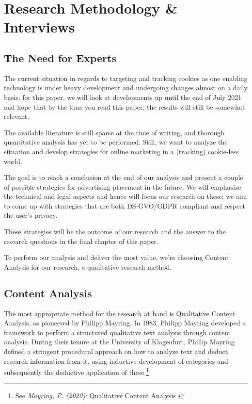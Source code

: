 %
%

\pagebreak
\section{Research Methodology \& Interviews}

\onehalfspacing

\subsection{The Need for Experts}

The current situation in regards to targeting and tracking cookies as one enabling technology is under heavy development and undergoing changes almost on a daily basis; for this paper, we will look at developments up until the end of July 2021 and hope that by the time you read this paper, the results will still be somewhat relevant.

The available literature is still sparse at the time of writing, and thorough quantitative analysis has yet to be performed. Still, we want to analyze the situation and develop strategies for online marketing in a (tracking) cookie-less world.

The goal is to reach a conclusion at the end of our analysis and present a couple of possible strategies for advertising placement in the future. We will emphasize the technical and legal aspects and hence will focus our research on these; we aim to come up with strategies that are both DS-GVO/GDPR compliant and respect the user's privacy.

These strategies will be the outcome of our research and the answer to the research questions in the final chapter of this paper.

To perform our analysis and deliver the most value, we're choosing Content Analysis for our research, a qualitative research method.

\subsection{Content Analysis}

The most appropriate method for the research at hand is Qualitative Content Analysis, as pioneered by Philipp Mayring. In 1983, Philipp Mayring developed a framework to perform a structured qualitative text analysis through content analysis. During their tenure at the University of Klagenfurt, Phillip Mayring defined a stringent procedural approach on how to analyze text and deduct research information from it, using inductive development of categories and subsequently the deductive application of these.\footnote{See \textit{Mayring, P. (2020)}: Qualitative Content Analysis \cite{qualiContent}}


